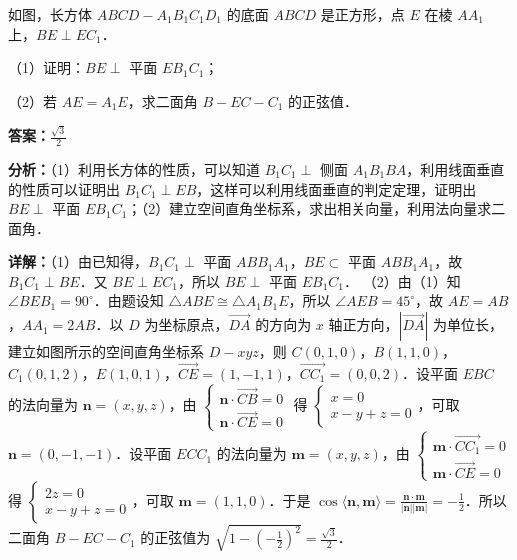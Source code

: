 \begin{question}[points=12]
如图，长方体 $ABCD-A_1B_1C_1D_1$ 的底面 $ABCD$ 是正方形，点 $E$ 在棱 $AA_1$ 上，$BE\perp EC_1$．

（1）证明：$BE\perp$ 平面 $EB_1C_1$；

（2）若 $AE=A_1E$，求二面角 $B-EC-C_1$ 的正弦值．
\begin{solution}
\textbf{答案：}$\frac{\sqrt{3}}{2}$

\textbf{分析：}（1）利用长方体的性质，可以知道 $B_1C_1\perp$ 侧面 $A_1B_1BA$，利用线面垂直的性质可以证明出 $B_1C_1\perp EB$，这样可以利用线面垂直的判定定理，证明出 $BE\perp$ 平面 $EB_1C_1$；（2）建立空间直角坐标系，求出相关向量，利用法向量求二面角．

\textbf{详解：}（1）由已知得，$B_1C_1\perp$ 平面 $ABB_1A_1$，$BE\subset$ 平面 $ABB_1A_1$，故 $B_1C_1\perp BE$．又 $BE\perp EC_1$，所以 $BE\perp$ 平面 $EB_1C_1$．
（2）由（1）知 $\angle BEB_1=90^\circ$．由题设知 $\triangle ABE\cong\triangle A_1B_1E$，所以 $\angle AEB=45^\circ$，故 $AE=AB$，$AA_1=2AB$．以 $D$ 为坐标原点，$\overrightarrow{DA}$ 的方向为 $x$ 轴正方向，$|\overrightarrow{DA}|$ 为单位长，建立如图所示的空间直角坐标系 $D-xyz$，则 $C(0,1,0)$，$B(1,1,0)$，$C_1(0,1,2)$，$E(1,0,1)$，$\overrightarrow{CE}=(1,-1,1)$，$\overrightarrow{CC_1}=(0,0,2)$．设平面 $EBC$ 的法向量为 $\mathbf{n}=(x,y,z)$，由 $\begin{cases} \mathbf{n}\cdot\overrightarrow{CB}=0 \\ \mathbf{n}\cdot\overrightarrow{CE}=0 \end{cases}$ 得 $\begin{cases} x=0 \\ x-y+z=0 \end{cases}$，可取 $\mathbf{n}=(0,-1,-1)$．设平面 $ECC_1$ 的法向量为 $\mathbf{m}=(x,y,z)$，由 $\begin{cases} \mathbf{m}\cdot\overrightarrow{CC_1}=0 \\ \mathbf{m}\cdot\overrightarrow{CE}=0 \end{cases}$ 得 $\begin{cases} 2z=0 \\ x-y+z=0 \end{cases}$，可取 $\mathbf{m}=(1,1,0)$．于是 $\cos\langle\mathbf{n},\mathbf{m}\rangle=\frac{\mathbf{n}\cdot\mathbf{m}}{|\mathbf{n}||\mathbf{m}|}=-\frac{1}{2}$．所以二面角 $B-EC-C_1$ 的正弦值为 $\sqrt{1-(-\frac{1}{2})^2}=\frac{\sqrt{3}}{2}$．
\end{solution}
\end{question}

